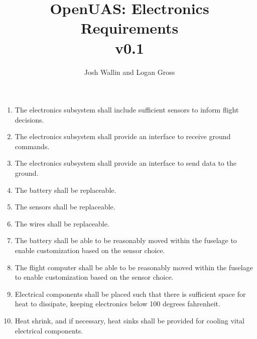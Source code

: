 \documentclass{article} %
\begin{document}
\title{OpenUAS: Electronics Requirements\\ v0.1}

\author{Josh Wallin and Logan Gross}

\maketitle

\begin{enumerate}

\item The electronics subsystem shall include sufficient sensors to inform flight decisions.\\

\item The electronics subsystem shall provide an interface to receive ground commands.\\

\item The electronics subsystem shall provide an interface to send data to the ground.\\

\item The battery shall be replaceable.\\

\item The sensors shall be replaceable.\\

\item The wires shall be replaceable.\\

\item The battery shall be able to be reasonably moved within the fuselage to enable customization based on the sensor choice.\\

\item The flight computer shall be able to be reasonably moved within the fuselage to enable customization based on the sensor choice.\\

\item Electrical components shall be placed such that there is sufficient space for heat to dissipate, keeping electronics below 100 degrees fahrenheit.\\

\item Heat shrink, and if necessary, heat sinks shall be provided for cooling vital electrical components.\\


\end{enumerate}
\end{document}
